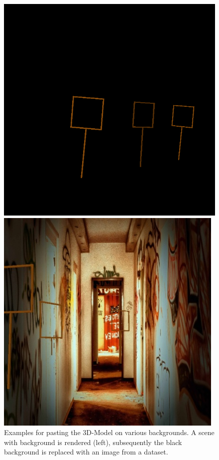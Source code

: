 \begin{figure}[hbtp]
	\centering
	\begin{minipage}{0.49\textwidth}
		\includegraphics[width=\textwidth]{fig/shot}
	\end{minipage}
	\begin{minipage}{0.49\textwidth}
		\includegraphics[width=\textwidth]{fig/random_bg2}
	\end{minipage}
	\caption{Examples for pasting the 3D-Model on various backgrounds. A scene with background is rendered (left), subsequently the black background is replaced with an image from a dataset.}
	\label{fig:random_bg}
\end{figure}

